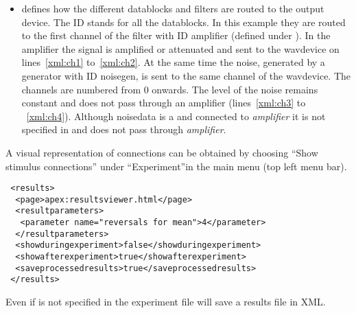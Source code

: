  

\begin{itemize}
\item {} defines how the different datablocks
and filters are routed to the output device. The ID 
stands for all the datablocks. In this example they are routed to
the first channel of the filter with ID {amplifier} (defined under
). In the amplifier the signal is amplified or
attenuated and sent to the wavdevice on lines~\ref{xml:ch1}
to~\ref{xml:ch2}. At the same time the noise, generated by a
generator with ID noisegen, is sent to the same channel of the
wavdevice. The channels are numbered from 0 onwards. The level of
the noise remains constant and does not pass through an amplifier
(lines~\ref{xml:ch3} to ~\ref{xml:ch4}). Although noisedata is a
 and connected to \emph{amplifier} it is not
specified in  and does not pass through
\emph{amplifier}.
\end{itemize}

A visual representation of connections can be obtained by choosing
``Show stimulus connections'' under ``Experiment''in the main
\apex menu (top left menu bar).


\begin{lstlisting}
 <results>
  <page>apex:resultsviewer.html</page>
  <resultparameters>
   <parameter name="reversals for mean">4</parameter>
  </resultparameters>
  <showduringexperiment>false</showduringexperiment>
  <showafterexperiment>true</showafterexperiment>
  <saveprocessedresults>true</saveprocessedresults>
 </results>
\end{lstlisting}


 Even if  is not specified in
the experiment file \apex will save a results file in XML.

